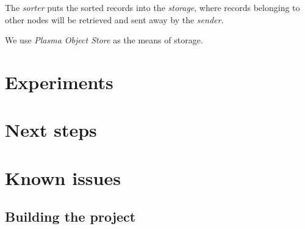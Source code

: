 \documentclass{article}
\begin{document}
The \textit{sorter} puts the sorted records into the \textit{storage}, where records belonging to other nodes will be retrieved and sent away by the \textit{sender}.

We use \textit{Plasma Object Store} as the means of storage.

\section{Experiments}

\section{Next steps}

\appendix
\section{Known issues}
\subsection{Building the project}
\end{document}
